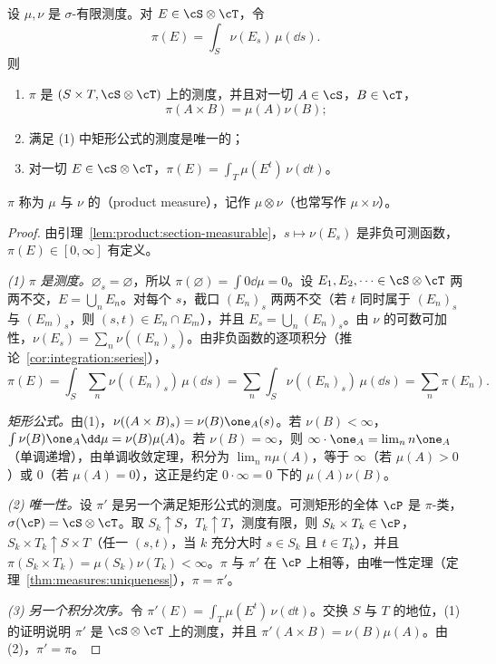 \begin{theorem}[乘积测度]\label{thm:product:product-measure}
设 $\mu,\nu$ 是 $\sigma$-有限测度。对 $E\in\cS\otimes\cT$，令
\[
\pi(E)=\int_S\nu(E_s)\,\mu(\dd s).
\]
则
\begin{enumerate}
\item $\pi$ 是 $(S\times T,\cS\otimes\cT)$ 上的测度，并且对一切 $A\in\cS$，$B\in\cT$，
\[
\pi(A\times B)=\mu(A)\nu(B);
\]
\item 满足 (1) 中矩形公式的测度是唯一的；
\item 对一切 $E\in\cS\otimes\cT$，$\pi(E)=\int_T\mu(E^t)\,\nu(\dd t)$。
\end{enumerate}
$\pi$ 称为 $\mu$ 与 $\nu$ 的（product measure），记作 $\mu\otimes\nu$（也常写作 $\mu\times\nu$）。
\end{theorem}
\begin{proof}
由引理~\ref{lem:product:section-measurable}，$s\mapsto\nu(E_s)$ 是非负可测函数，$\pi(E)\in[0,\infty]$ 有定义。

\emph{(1) $\pi$ 是测度。}$\varnothing_s=\varnothing$，所以 $\pi(\varnothing)=\int0\dd\mu=0$。设 $E_1,E_2,\dots\in\cS\otimes\cT$ 两两不交，$E=\bigcup_nE_n$。对每个 $s$，截口 $(E_n)_s$ 两两不交（若 $t$ 同时属于 $(E_n)_s$ 与 $(E_m)_s$，则 $(s,t)\in E_n\cap E_m$），并且 $E_s=\bigcup_n(E_n)_s$。由 $\nu$ 的可数可加性，$\nu(E_s)=\sum_n\nu((E_n)_s)$。由非负函数的逐项积分（推论~\ref{cor:integration:series}），
\[
\pi(E)=\int_S\sum_n\nu((E_n)_s)\,\mu(\dd s)=\sum_n\int_S\nu((E_n)_s)\,\mu(\dd s)=\sum_n\pi(E_n).
\]

\emph{矩形公式。}由(1)，$\nu((A\times B)_s)=\nu(B)\one_A(s)$。若 $\nu(B)<\infty$，$\int\nu(B)\one_A\dd\mu=\nu(B)\mu(A)$。若 $\nu(B)=\infty$，则 $\infty\cdot\one_A=\lim_nn\one_A$（单调递增），由单调收敛定理，积分为 $\lim_nn\mu(A)$，等于 $\infty$（若 $\mu(A)>0$）或 $0$（若 $\mu(A)=0$），这正是约定 $0\cdot\infty=0$ 下的 $\mu(A)\nu(B)$。

\emph{(2) 唯一性。}设 $\pi'$ 是另一个满足矩形公式的测度。可测矩形的全体 $\cP$ 是 $\pi$-类，$\sigma(\cP)=\cS\otimes\cT$。取 $S_k\uparrow S$，$T_k\uparrow T$，测度有限，则 $S_k\times T_k\in\cP$，$S_k\times T_k\uparrow S\times T$（任一 $(s,t)$，当 $k$ 充分大时 $s\in S_k$ 且 $t\in T_k$），并且 $\pi(S_k\times T_k)=\mu(S_k)\nu(T_k)<\infty$。$\pi$ 与 $\pi'$ 在 $\cP$ 上相等，由唯一性定理（定理~\ref{thm:measures:uniqueness}），$\pi=\pi'$。

\emph{(3) 另一个积分次序。}令 $\pi'(E)=\int_T\mu(E^t)\,\nu(\dd t)$。交换 $S$ 与 $T$ 的地位，(1) 的证明说明 $\pi'$ 是 $\cS\otimes\cT$ 上的测度，并且 $\pi'(A\times B)=\nu(B)\mu(A)$。由 (2)，$\pi'=\pi$。
\end{proof}

